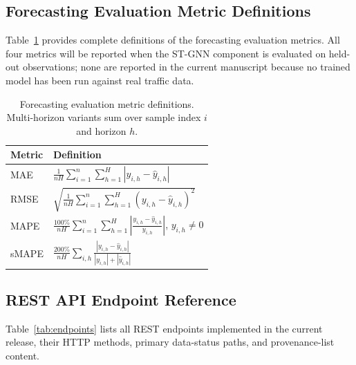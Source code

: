 
\subsection{Forecasting Evaluation Metric Definitions}

Table~\ref{tab:metrics} provides complete definitions of the forecasting
evaluation metrics.
All four metrics will be reported when the ST-GNN component is evaluated
on held-out observations; none are reported in the current manuscript
because no trained model has been run against real traffic data.

\begin{table}[t]
\caption{Forecasting evaluation metric definitions.
         Multi-horizon variants sum over sample index $i$ and horizon $h$.}
\label{tab:metrics}
\centering
\renewcommand{\arraystretch}{1.30}
\begin{tabular}{@{}lp{5.5cm}@{}}
\toprule
\textbf{Metric} & \textbf{Definition} \\
\midrule
MAE
  & $\displaystyle\frac{1}{nH}\sum_{i=1}^{n}\sum_{h=1}^{H}
    |y_{i,h}-\hat{y}_{i,h}|$ \\[8pt]
RMSE
  & $\displaystyle\sqrt{\frac{1}{nH}\sum_{i=1}^{n}\sum_{h=1}^{H}
    (y_{i,h}-\hat{y}_{i,h})^2}$ \\[8pt]
MAPE
  & $\displaystyle\frac{100\%}{nH}\sum_{i=1}^{n}\sum_{h=1}^{H}
    \left|\frac{y_{i,h}-\hat{y}_{i,h}}{y_{i,h}}\right|$,\quad
    $y_{i,h}\neq 0$ \\[8pt]
sMAPE
  & $\displaystyle\frac{200\%}{nH}\sum_{i,h}
    \frac{|y_{i,h}-\hat{y}_{i,h}|}{|y_{i,h}|+|\hat{y}_{i,h}|}$ \\
\bottomrule
\end{tabular}
\end{table}

\subsection{REST API Endpoint Reference}

Table~\ref{tab:endpoints} lists all REST endpoints implemented in the
current release, their HTTP methods, primary data-status paths, and
provenance-list content.

